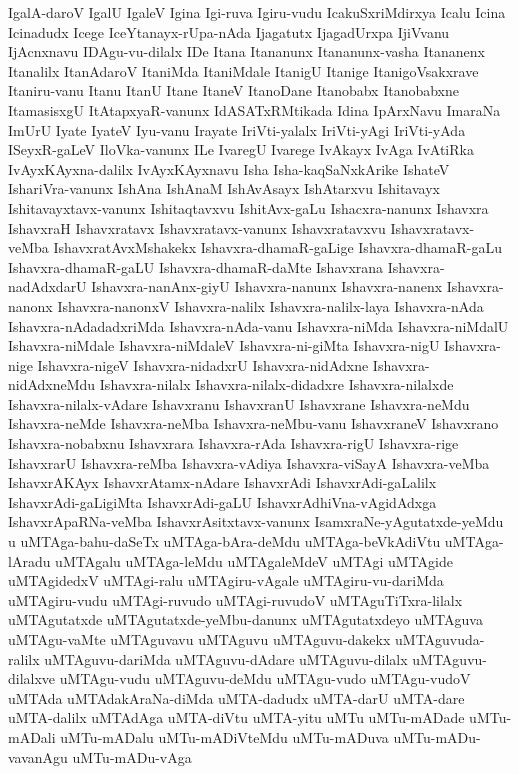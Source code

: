 {IgalA-daroV
IgalU
IgaleV
Igina
Igi-ruva
Igiru-vudu
IcakuSxriMdirxya
Icalu
Icina
Icinadudx
Icege
IceYtanayx-rUpa-nAda
Ijagatutx
IjagadUrxpa
IjiVvanu
IjAcnxnavu
IDAgu-vu-dilalx
IDe
Itana
Itananunx
Itananunx-vasha
Itananenx
Itanalilx
ItanAdaroV
ItaniMda
ItaniMdale
ItanigU
Itanige
ItanigoVsakxrave
Itaniru-vanu
Itanu
ItanU
Itane
ItaneV
ItanoDane
Itanobabx
Itanobabxne
ItamasisxgU
ItAtapxyaR-vanunx
IdASATxRMtikada
Idina
IpArxNavu
ImaraNa
ImUrU
Iyate
IyateV
Iyu-vanu
Irayate
IriVti-yalalx
IriVti-yAgi
IriVti-yAda
ISeyxR-gaLeV
IloVka-vanunx
ILe
IvaregU
Ivarege
IvAkayx
IvAga
IvAtiRka
IvAyxKAyxna-dalilx
IvAyxKAyxnavu
Isha
Isha-kaqSaNxkArike
IshateV
IshariVra-vanunx
IshAna
IshAnaM
IshAvAsayx
IshAtarxvu
Ishitavayx
Ishitavayxtavx-vanunx
Ishitaqtavxvu
IshitAvx-gaLu
Ishacxra-nanunx
Ishavxra
IshavxraH
Ishavxratavx
Ishavxratavx-vanunx
Ishavxratavxvu
Ishavxratavx-veMba
IshavxratAvxMshakekx
Ishavxra-dhamaR-gaLige
Ishavxra-dhamaR-gaLu
Ishavxra-dhamaR-gaLU
Ishavxra-dhamaR-daMte
Ishavxrana
Ishavxra-nadAdxdarU
Ishavxra-nanAnx-giyU
Ishavxra-nanunx
Ishavxra-nanenx
Ishavxra-nanonx
Ishavxra-nanonxV
Ishavxra-nalilx
Ishavxra-nalilx-laya
Ishavxra-nAda
Ishavxra-nAdadadxriMda
Ishavxra-nAda-vanu
Ishavxra-niMda
Ishavxra-niMdalU
Ishavxra-niMdale
Ishavxra-niMdaleV
Ishavxra-ni-giMta
Ishavxra-nigU
Ishavxra-nige
Ishavxra-nigeV
Ishavxra-nidadxrU
Ishavxra-nidAdxne
Ishavxra-nidAdxneMdu
Ishavxra-nilalx
Ishavxra-nilalx-didadxre
Ishavxra-nilalxde
Ishavxra-nilalx-vAdare
Ishavxranu
IshavxranU
Ishavxrane
Ishavxra-neMdu
Ishavxra-neMde
Ishavxra-neMba
Ishavxra-neMbu-vanu
IshavxraneV
Ishavxrano
Ishavxra-nobabxnu
Ishavxrara
Ishavxra-rAda
Ishavxra-rigU
Ishavxra-rige
IshavxrarU
Ishavxra-reMba
Ishavxra-vAdiya
Ishavxra-viSayA
Ishavxra-veMba
IshavxrAKAyx
IshavxrAtamx-nAdare
IshavxrAdi
IshavxrAdi-gaLalilx
IshavxrAdi-gaLigiMta
IshavxrAdi-gaLU
IshavxrAdhiVna-vAgidAdxga
IshavxrApaRNa-veMba
IshavxrAsitxtavx-vanunx
IsamxraNe-yAgutatxde-yeMdu
u
uMTAga-bahu-daSeTx
uMTAga-bAra-deMdu
uMTAga-beVkAdiVtu
uMTAga-lAradu
uMTAgalu
uMTAga-leMdu
uMTAgaleMdeV
uMTAgi
uMTAgide
uMTAgidedxV
uMTAgi-ralu
uMTAgiru-vAgale
uMTAgiru-vu-dariMda
uMTAgiru-vudu
uMTAgi-ruvudo
uMTAgi-ruvudoV
uMTAguTiTxra-lilalx
uMTAgutatxde
uMTAgutatxde-yeMbu-danunx
uMTAgutatxdeyo
uMTAguva
uMTAgu-vaMte
uMTAguvavu
uMTAguvu
uMTAguvu-dakekx
uMTAguvuda-ralilx
uMTAguvu-dariMda
uMTAguvu-dAdare
uMTAguvu-dilalx
uMTAguvu-dilalxve
uMTAgu-vudu
uMTAguvu-deMdu
uMTAgu-vudo
uMTAgu-vudoV
uMTAda
uMTAdakAraNa-diMda
uMTA-dadudx
uMTA-darU
uMTA-dare
uMTA-dalilx
uMTAdAga
uMTA-diVtu
uMTA-yitu
uMTu
uMTu-mADade
uMTu-mADali
uMTu-mADalu
uMTu-mADiVteMdu
uMTu-mADuva
uMTu-mADu-vavanAgu
uMTu-mADu-vAga
}
